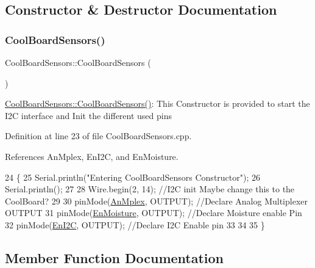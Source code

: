 \subsection{Constructor \& Destructor Documentation}
\mbox{\label{classCoolBoardSensors_a91ff2a02f5486f90cf2413a1cf8a9ed4}} 
\subsubsection{\texorpdfstring{Cool\+Board\+Sensors()}{CoolBoardSensors()}}
{\footnotesize\ttfamily Cool\+Board\+Sensors\+::\+Cool\+Board\+Sensors (\begin{DoxyParamCaption}{ }\end{DoxyParamCaption})}

\hyperlink{classCoolBoardSensors_a91ff2a02f5486f90cf2413a1cf8a9ed4}{Cool\+Board\+Sensors\+::\+Cool\+Board\+Sensors()}\+: This Constructor is provided to start the I2C interface and Init the different used pins 

Definition at line 23 of file Cool\+Board\+Sensors.\+cpp.



References An\+Mplex, En\+I2C, and En\+Moisture.


\begin{DoxyCode}
24 \{
25     Serial.println(\textcolor{stringliteral}{"Entering CoolBoardSensors Constructor"});
26     Serial.println();
27     
28     Wire.begin(2, 14);                       \textcolor{comment}{//I2C init Maybe change this to the CoolBoard?}
29 
30     pinMode(\hyperlink{classCoolBoardSensors_a12ef28b1046219e0aee10bf64e28c4a5}{AnMplex}, OUTPUT);                \textcolor{comment}{//Declare Analog Multiplexer OUTPUT}
31     pinMode(\hyperlink{classCoolBoardSensors_a6177d02e14a057a2f171a2e930b5038d}{EnMoisture}, OUTPUT);             \textcolor{comment}{//Declare Moisture enable Pin}
32     pinMode(\hyperlink{classCoolBoardSensors_aaa6b5dbf3a6633bffd9d204d961096dc}{EnI2C}, OUTPUT);           \textcolor{comment}{//Declare I2C Enable pin }
33 
34 
35 \}
\end{DoxyCode}


\subsection{Member Function Documentation}
\mbox{\label{classCoolBoardSensors_aa432c5aac88f89c31a10766390f23e0b}} 
